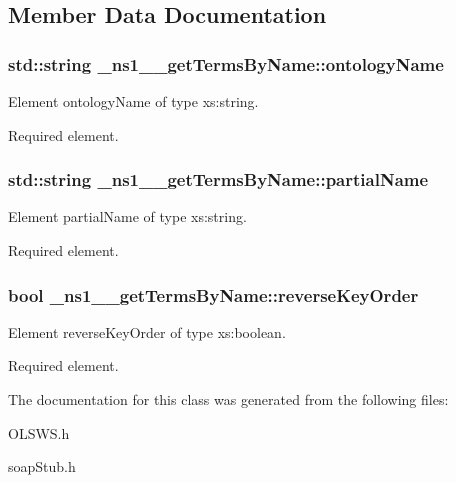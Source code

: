 \subsection{Member Data Documentation}
\hypertarget{class__ns1____getTermsByName_a99ffe00f624540925567b82e0300becc}{
\subsubsection[{ontologyName}]{\setlength{\rightskip}{0pt plus 5cm}std::string {\bf \_\-ns1\_\-\_\-getTermsByName::ontologyName}}}
\label{class__ns1____getTermsByName_a99ffe00f624540925567b82e0300becc}


Element ontologyName of type xs:string. 

Required element. \hypertarget{class__ns1____getTermsByName_a5f993bd8bc7b04308f02ba02005b9ab9}{
\subsubsection[{partialName}]{\setlength{\rightskip}{0pt plus 5cm}std::string {\bf \_\-ns1\_\-\_\-getTermsByName::partialName}}}
\label{class__ns1____getTermsByName_a5f993bd8bc7b04308f02ba02005b9ab9}


Element partialName of type xs:string. 

Required element. \hypertarget{class__ns1____getTermsByName_a7195613676edeef3542c6f102216fce8}{
\subsubsection[{reverseKeyOrder}]{\setlength{\rightskip}{0pt plus 5cm}bool {\bf \_\-ns1\_\-\_\-getTermsByName::reverseKeyOrder}}}
\label{class__ns1____getTermsByName_a7195613676edeef3542c6f102216fce8}


Element reverseKeyOrder of type xs:boolean. 

Required element. 

The documentation for this class was generated from the following files:\begin{DoxyCompactItemize}
\item 
OLSWS.h\item 
soapStub.h\end{DoxyCompactItemize}
